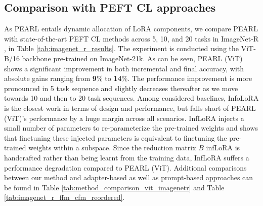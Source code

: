 \documentclass[10pt]{article} %
\begin{document}
\subsection{Comparison with PEFT CL approaches}
As PEARL entails dynamic allocation of LoRA components, we compare PEARL with state-of-the-art PEFT CL methods across 5, 10, and 20 tasks in ImageNet-R \citep{hendrycks2021many}, in Table \ref{tab:imagenet_r_results}. The experiment is conducted using the ViT-B/16 backbone \citep{dosovitskiy2020image} pre-trained on ImageNet-21k. As can be seen, PEARL (ViT) shows a significant improvement in both incremental and final accuracy, with absolute gains ranging from \textbf{9}\% to \textbf{14}\%. The performance improvement is more pronounced in 5 task sequence and slightly decreases thereafter as we move towards 10 and then to 20 task sequences. Among considered baselines, InfoLoRA is the closest work in terms of design and performance, but falls short of PEARL (ViT)'s performance by a huge margin across all scenarios. InfLoRA injects a small number of parameters to re-parameterize the pre-trained weights and shows that finetuning these injected parameters is equivalent to finetuning the pre-trained weights within a subspace. Since the reduction matrix $B$ infLoRA is handcrafted rather than being learnt from the training data,  InfLoRA suffers a performance degradation compared to PEARL (ViT). Additional comparisons between our method and adapter-based as well as prompt-based approaches can be found in Table \ref{tab:method_comparison_vit_imagenetr} and Table \ref{tab:imagenet_r_ffm_cfm_reordered}.
\end{document}
